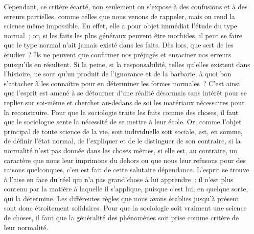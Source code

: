 \documentclass[french,twoside]{book} %
\begin{document}
Cependant, ce critère écarté, non seulement on s’expose à des confusions et à des erreurs partielles, comme celles que nous venons de rappeler, mais on rend la science même impossible. En effet, elle a pour objet immédiat l’étude du type normal ; or, si les faits les plus généraux peuvent être morbides, il peut se faire que le type normal n’ait jamais existé dans les faits. Dès lors, que sert de les étudier ? Ils ne peuvent que confirmer nos préjugés et enraciner nos erreurs puisqu’ils en résultent. Si la peine, si la responsabilité, telles qu’elles existent dans l’histoire, ne sont qu’un produit de l’ignorance et de la barbarie, à quoi bon s’attacher à les connaître pour en déterminer les formes normales ? C’est ainsi que l’esprit est amené à se détourner d’une réalité désormais sans intérêt pour se replier sur soi-même et chercher au-dedans de soi les matériaux nécessaires pour la reconstruire. Pour que la sociologie traite les faits comme des choses, il faut que le sociologue sente la nécessité de se mettre à leur école. Or, comme l’objet principal de toute science de la vie, soit individuelle soit sociale, est, en somme, de définir l’état normal, de l’expliquer et de le distinguer de son contraire, si la normalité n’est pas donnée dans les choses mêmes, si elle est, au contraire, un caractère que nous leur imprimons du dehors ou que nous leur refusons pour des raisons quelconques, c’en est fait de cette salutaire dépendance. L’esprit se trouve à l’aise en face du réel qui n’a pas grand’chose à lui apprendre ; il n’est plus contenu par la matière à laquelle il s’applique, puisque c’est lui, en quelque sorte, qui la détermine. Les différentes règles que nous avons établies jusqu’à présent sont donc étroitement solidaires. Pour que la sociologie soit vraiment une science de choses, il faut que la généralité des phénomènes soit prise comme critère de leur normalité.\par
\end{document}
